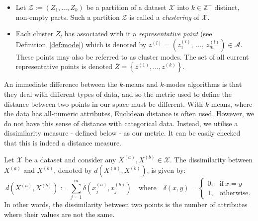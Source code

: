 \begin{itemize}
    \item Let \(\mathcal{Z} := \left(Z_1, \ldots, Z_k\right)\) be a partition
        of a dataset \(\mathcal{X}\) into \(k \in \mathbb{Z}^{+}\) distinct,
        non-empty parts. Such a partition \(\mathcal{Z}\) is called a
        \emph{clustering} of \(\mathcal{X}\).

    \item Each cluster \(Z_l\) has associated with it a \emph{representative
        point} (see Definition~\ref{def:mode}) which is denoted by \(z^{(l)} =
        \left(z_1^{(l)},~\ldots,~z_m^{(l)}\right) \in \mathcal{A}\).  These
        points may also be referred to as cluster modes. The set of all current
        representative points is denoted \(\overline Z = \left\{z^{(1)}, \ldots,
        z^{(k)}\right\}\).
\end{itemize}


An immediate difference between the \(k\)-means and \(k\)-modes algorithms is 
that they deal with different types of data, and so the metric used to define 
the distance between two points in our space must be different. With 
\(k\)-means, where the data has all-numeric attributes, Euclidean distance is 
often used. However, we do not have this sense of distance with categorical 
data. Instead, we utilise a dissimilarity measure \-- defined below \-- as our 
metric. It can be easily checked that this is indeed a distance measure.

\begin{definition}\label{def:dissim}
    Let \(\mathcal{X}\) be a dataset and consider any \(X^{(a)}, X^{(b)} \in
    \mathcal{X}\). The dissimilarity between \(X^{(a)}\) and \(X^{(b)}\),
    denoted by \(d\left(X^{(a)}, X^{(b)}\right)\), is given by:
    \begin{equation}
        d(X^{(a)}, X^{(b)}) := \sum_{j=1}^{m} \delta(x_j^{(a)}, x_j^{(b)}) \quad
        \text{where} \quad \delta(x, y) = \begin{cases}
                                              0, & \text{if} \ x = y \\
			    		                      1, & \text{otherwise.}
				    	                  \end{cases}
    \end{equation}
    In other words, the dissimilarity between two points is the number of
    attributes where their values are not the same.
\end{definition}

%

